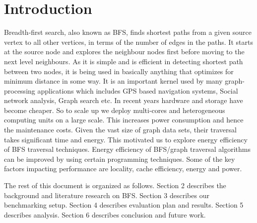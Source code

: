 \section{Introduction}
\label{intro}

Breadth-first search, also known as BFS, finds shortest paths from a given
source vertex to all other vertices, in terms of the number of edges in the
paths. It starts at the source node and explores the neighbour nodes first
before moving to the next level neighbours. As it is simple and is efficient in
detecting shortest path between two nodes, it is being used in basically
anything that optimizes for minimum distance in some way. It is an important
kernel used by many graph-processing applications which includes GPS based
navigation systems, Social network analysis, Graph search etc.
In recent years hardware and storage have become cheaper. So to scale up we deploy
multi-cores and heterogeneous computing units on a large scale. This increases
power consumption and hence the maintenance costs. Given the vast size of graph
data sets, their traversal takes significant time and energy. This motivated us
to explore energy efficiency of BFS traversal techniques.  Energy efficiency of
BFS/graph traversal algorithms can be improved by using certain programming
techniques. Some of the key factors impacting performance are locality, cache
efficiency, energy and power.




%
%

The rest of this document is organized as follows.  Section 2
describes the background and literature research on BFS.  Section
3 describes our benchmarking setup.  Section 4 describes evaluation plan
and results.  Section 5 describes analysis.  Section 6 describes
conclusion and future work.

